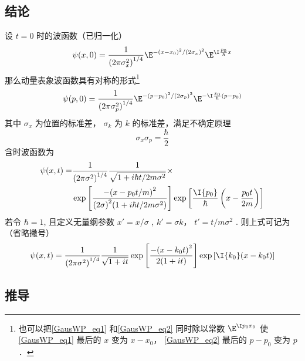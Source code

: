 

\subsection{结论}
设 $t = 0$ 时的波函数（已归一化）
\begin{equation}\label{GausWP_eq1}
\psi (x,0) = \frac{1}{{(2\pi {\sigma_x ^2})}^{1/4}}{\E^{ - {{(x - {x_0})}^2}/{{(2\sigma_x )}^2}}}{\E^{\I \frac{p_0}{\hbar}x}}
\end{equation}
那么动量表象波函数具有对称的形式\footnote{也可以把\autoref{GausWP_eq1} 和\autoref{GausWP_eq2} 同时除以常数 $\E^{\I p_0 x_0}$ 使\autoref{GausWP_eq1} 最后的 $x$ 变为 $x-x_0$， \autoref{GausWP_eq2} 最后的 $p-p_0$ 变为 $p$． }
\begin{equation}\label{GausWP_eq2}
\psi (p,0) = \frac{1}{{(2\pi \sigma_p^2)}^{1/4}}{\E^{ - {{(p - {p_0})}^2}/{{(2{\sigma_p})}^2}}}{\E^{ - \I\frac{x_0}{\hbar }(p - {p_0})}}
\end{equation}
其中 $\sigma_x$ 为位置的标准差， $\sigma_k$ 为 $k$ 的标准差，满足不确定原理
\begin{equation}
\sigma_x\sigma_p = \frac{\hbar}{2}
\end{equation}
含时波函数为
\begin{equation}\begin{aligned}
\psi (x,t) = &\frac{1}{{(2\pi {\sigma ^2})}^{1/4}}\frac{1}{\sqrt {1 + i\hbar t/2m{\sigma ^2}} }\times\\
&\exp \left[ {\frac{ - {{(x - {p_0}t/m)}^2}}{{{(2\sigma )}^2}(1 + i\hbar t/2m{\sigma ^2})}} \right]\exp \left[ {\frac{\I{p_0}}{\hbar }\left( {x - \frac{{p_0}t}{2m}} \right)} \right]
\end{aligned}\end{equation}
若令 $\hbar  = 1$, 且定义无量纲参数 $x' = x/\sigma$ ,  $k' = \sigma k$， $t' = t/m\sigma^2$  . 则上式可记为（省略撇号）
\begin{equation}
\psi (x,t) = \frac{1}{{(2\pi {\sigma ^2})}^{1/4}}\frac{1}{\sqrt {1 + it} }\exp \left[ {\frac{ - {{(x - {k_0}t)}^2}}{2(1 + it)}} \right]\exp \left[ {\I {k_0}(x - {k_0}t)} \right]
\end{equation}

\subsection{推导}

